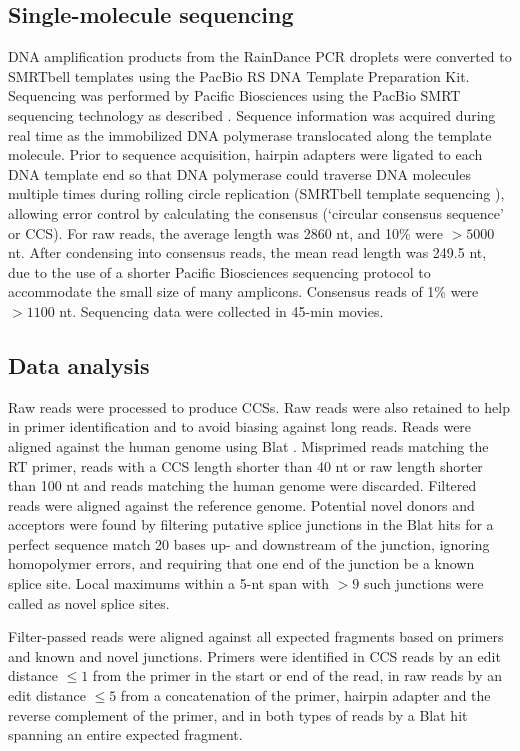 \documentclass[../sherrill-Mix_thesis.tex]{subfiles}
\begin{document}
\subsection{Single-molecule sequencing}
DNA amplification products from the RainDance PCR droplets were converted to SMRTbell templates using the PacBio RS DNA Template Preparation Kit. Sequencing was performed by Pacific Biosciences using the PacBio SMRT sequencing technology as described \citep{Eid2009}. Sequence information was acquired during real time as the immobilized DNA polymerase translocated along the template molecule. Prior to sequence acquisition, hairpin adapters were ligated to each DNA template end so that DNA polymerase could traverse DNA molecules multiple times during rolling circle replication (SMRTbell template sequencing \citep{Travers2010}), allowing error control by calculating the consensus (`circular consensus sequence' or CCS). For raw reads, the average length was 2860 nt, and 10\% were $>5000$ nt. After condensing into consensus reads, the mean read length was 249.5 nt, due to the use of a shorter Pacific Biosciences sequencing protocol to accommodate the small size of many amplicons. Consensus reads of 1\% were $>1100$ nt. Sequencing data were collected in 45-min movies.

\subsection{Data analysis}
Raw reads were processed to produce CCSs. Raw reads were also retained to help in primer identification and to avoid biasing against long reads. Reads were aligned against the human genome using Blat \citep{Kent2002}. Misprimed reads matching the RT primer, reads with a CCS length shorter than 40 nt or raw length shorter than 100 nt and reads matching the human genome were discarded. Filtered reads were aligned against the \hivEight{} reference genome. Potential novel donors and acceptors were found by filtering putative splice junctions in the Blat hits for a perfect sequence match 20 bases up- and downstream of the junction, ignoring homopolymer errors, and requiring that one end of the junction be a known splice site. Local maximums within a 5-nt span with $>9$ such junctions were called as novel splice sites.

Filter-passed reads were aligned against all expected fragments based on primers and known and novel junctions. Primers were identified in CCS reads by an edit distance $\le 1$ from the primer in the start or end of the read, in raw reads by an edit distance $\le 5$ from a concatenation of the primer, hairpin adapter and the reverse complement of the primer, and in both types of reads by a Blat hit spanning an entire expected fragment.
\end{document}
